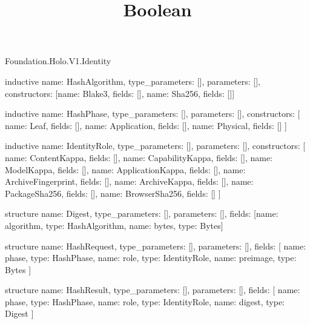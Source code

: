 \begin{lexlean}{Foundation.Holo.V1.Identity}
\title{Boolean}
\begin{semanticmodule}
inductive{
  name: HashAlgorithm,
  type_parameters: [],
  parameters: [],
  constructors: [{name: Blake3, fields: []}, {name: Sha256, fields: []}]
}

inductive{
  name: HashPhase,
  type_parameters: [],
  parameters: [],
  constructors: [
    {name: Leaf, fields: []},
    {name: Application, fields: []},
    {name: Physical, fields: []}
  ]
}

inductive{
  name: IdentityRole,
  type_parameters: [],
  parameters: [],
  constructors: [
    {name: ContentKappa, fields: []},
    {name: CapabilityKappa, fields: []},
    {name: ModelKappa, fields: []},
    {name: ApplicationKappa, fields: []},
    {name: ArchiveFingerprint, fields: []},
    {name: ArchiveKappa, fields: []},
    {name: PackageSha256, fields: []},
    {name: BrowserSha256, fields: []}
  ]
}

structure{
  name: Digest,
  type_parameters: [],
  parameters: [],
  fields: [{name: algorithm, type: HashAlgorithm}, {name: bytes, type: Bytes}]
}

structure{
  name: HashRequest,
  type_parameters: [],
  parameters: [],
  fields: [
    {name: phase, type: HashPhase},
    {name: role, type: IdentityRole},
    {name: preimage, type: Bytes}
  ]
}

structure{
  name: HashResult,
  type_parameters: [],
  parameters: [],
  fields: [
    {name: phase, type: HashPhase},
    {name: role, type: IdentityRole},
    {name: digest, type: Digest}
  ]
}
\end{semanticmodule}
\end{lexlean}
